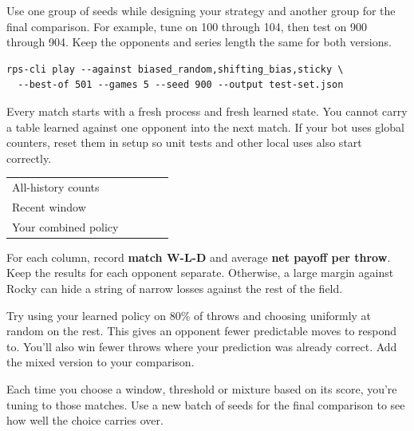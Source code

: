 \documentclass[11pt]{article}
\begin{document}

Use one group of seeds while designing your strategy and another group for the final comparison. For example, tune on 100 through 104, then test on 900 through 904. Keep the opponents and series length the same for both versions.


\begin{lstlisting}[style=shell,numbers=none,xleftmargin=4pt,framexleftmargin=0pt]
rps-cli play --against biased_random,shifting_bias,sticky \
  --best-of 501 --games 5 --seed 900 --output test-set.json
\end{lstlisting}

Every match starts with a fresh process and fresh learned state. You cannot carry a table learned against one opponent into the next match. If your bot uses global counters, reset them in setup so unit tests and other local uses also start correctly.


\smallskip\begingroup\small
\setlength{\tabcolsep}{5pt}
\renewcommand{\arraystretch}{1.17}
\begin{tabularx}{\linewidth}{@{}L{.25\linewidth}YYYY@{}}
\toprule
{} &  &  &  &  \\
\midrule
\rule{0pt}{22pt}All-history counts &  &  &  &  \\
\rule{0pt}{22pt}Recent window &  &  &  &  \\
\rule{0pt}{22pt}Your combined policy &  &  &  &  \\
\bottomrule
\end{tabularx}\endgroup\par\smallskip

For each column, record \textbf{match W-L-D} and average \textbf{net payoff per throw}. Keep the results for each opponent separate. Otherwise, a large margin against Rocky can hide a string of narrow losses against the rest of the field.



Try using your learned policy on 80\% of throws and choosing uniformly at random on the rest. This gives an opponent fewer predictable moves to respond to. You'll also win fewer throws where your prediction was already correct. Add the mixed version to your comparison.


Each time you choose a window, threshold or mixture based on its score, you're tuning to those matches. Use a new batch of seeds for the final comparison to see how well the choice carries over.
\end{document}
